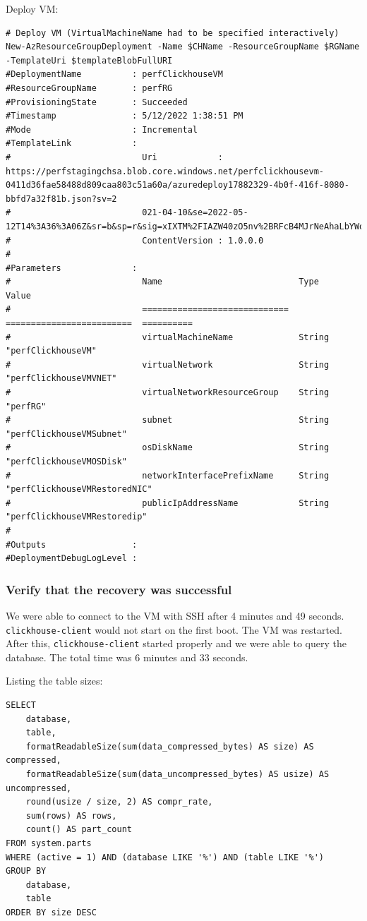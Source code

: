 Deploy VM:
\begin{verbatim}
# Deploy VM (VirtualMachineName had to be specified interactively)
New-AzResourceGroupDeployment -Name $CHName -ResourceGroupName $RGName -TemplateUri $templateBlobFullURI
#DeploymentName          : perfClickhouseVM
#ResourceGroupName       : perfRG
#ProvisioningState       : Succeeded
#Timestamp               : 5/12/2022 1:38:51 PM
#Mode                    : Incremental
#TemplateLink            :
#                          Uri            : https://perfstagingchsa.blob.core.windows.net/perfclickhousevm-0411d36fae58488d809caa803c51a60a/azuredeploy17882329-4b0f-416f-8080-bbfd7a32f81b.json?sv=2
#                          021-04-10&se=2022-05-12T14%3A36%3A06Z&sr=b&sp=r&sig=xIXTM%2FIAZW40zO5nv%2BRFcB4MJrNeAhaLbYWo4oMHKz0%3D
#                          ContentVersion : 1.0.0.0
#
#Parameters              :
#                          Name                           Type                       Value
#                          =============================  =========================  ==========
#                          virtualMachineName             String                     "perfClickhouseVM"
#                          virtualNetwork                 String                     "perfClickhouseVMVNET"
#                          virtualNetworkResourceGroup    String                     "perfRG"
#                          subnet                         String                     "perfClickhouseVMSubnet"
#                          osDiskName                     String                     "perfClickhouseVMOSDisk"
#                          networkInterfacePrefixName     String                     "perfClickhouseVMRestoredNIC"
#                          publicIpAddressName            String                     "perfClickhouseVMRestoredip"
#
#Outputs                 :
#DeploymentDebugLogLevel :
\end{verbatim}

\subsubsection{Verify that the recovery was successful}
\label{sec:org7d71d01}
We were able to connect to the VM with SSH after 4 minutes and 49 seconds.
\texttt{clickhouse-client} would not start on the first boot.
The VM was restarted.
After this, \texttt{clickhouse-client} started properly and we were able to query the database.
The total time was 6 minutes and 33 seconds.

Listing the table sizes:
\begin{verbatim}
SELECT
    database,
    table,
    formatReadableSize(sum(data_compressed_bytes) AS size) AS compressed,
    formatReadableSize(sum(data_uncompressed_bytes) AS usize) AS uncompressed,
    round(usize / size, 2) AS compr_rate,
    sum(rows) AS rows,
    count() AS part_count
FROM system.parts
WHERE (active = 1) AND (database LIKE '%') AND (table LIKE '%')
GROUP BY
    database,
    table
ORDER BY size DESC
\end{verbatim}

